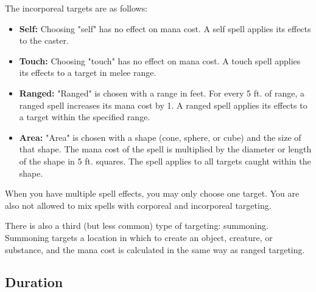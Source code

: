 The incorporeal targets are as follows:
\begin{itemize}
    \item \textbf{Self:} Choosing "self" has no effect on mana cost. A self
        spell applies its effects to the caster.
    \item \textbf{Touch:} Choosing "touch" has no effect on mana cost. A touch
        spell applies its effects to a target in melee range.
    \item \textbf{Ranged:} "Ranged" is chosen with a range in feet. For every
        5 ft. of range, a ranged spell increases its mana cost by 1. A ranged
        spell applies its effects to a target within the specified range.
    \item \textbf{Area:} "Area" is chosen with a shape (cone, sphere, or cube)
        and the size of that shape. The mana cost of the spell is multiplied
        by the diameter or length of the shape in 5 ft. squares. The spell
        applies to all targets caught within the shape.
\end{itemize}

When you have multiple spell effects, you may only choose one target. You are
also not allowed to mix spells with corporeal and incorporeal targeting.

There is also a third (but less common) type of targeting: summoning. Summoning
targets a location in which to create an object, creature, or substance, and
the mana cost is calculated in the same way as ranged targeting.

\subsection{Duration}

